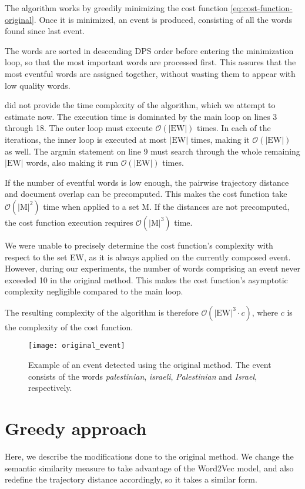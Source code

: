 The algorithm works by greedily minimizing the cost function \ref{eq:cost-function-original}. Once it is minimized, an event is produced, consisting of all the words found since last event.

The words are sorted in descending DPS order before entering the minimization loop, so that the most important words are processed first. This assures that the most eventful words are assigned together, without wasting them to appear with low quality words.

\cite{event-detection} did not provide the time complexity of the algorithm, which we attempt to estimate now. The execution time is dominated by the main loop on lines 3 through 18. The outer loop must execute $\mathcal{O}(|\text{EW}|)$ times. In each of the iterations, the inner loop is executed at most $|\text{EW}|$ times, making it $\mathcal{O}(|\text{EW}|)$ as well. The argmin statement on line 9 must search through the whole remaining $|\text{EW}|$ words, also making it run $\mathcal{O}(|\text{EW}|)$ times.

If the number of eventful words is low enough, the pairwise trajectory distance and document overlap can be precomputed. This makes the cost function take $\mathcal{O}(|\text{M}|^{2})$ time when applied to a set M. If the distances are not precomputed, the cost function execution requires $\mathcal{O}(|\text{M}|^{3})$ time.

We were unable to precisely determine the cost function's complexity with respect to the set EW, as it is always applied on the currently composed event. However, during our experiments, the number of words comprising an event never exceeded 10 in the original method. This makes the cost function's asymptotic complexity negligible compared to the main loop.

The resulting complexity of the algorithm is therefore $\mathcal{O}(|\text{EW}|^{3} \cdot c)$, where $c$ is the complexity of the cost function.


\begin{figure}[H]
  \centering
  \texttt{[image: original\_event]}  %
  \caption{Example of an event detected using the original method. The event consists of the words \textit{palestinian}, \textit{israeli}, \textit{Palestinian} and \textit{Israel}, respectively.}
  \label{fig:original-event}
\end{figure}


\section{Greedy approach}
Here, we describe the modifications done to the original method. We change the semantic similarity measure to take advantage of the Word2Vec model, and also redefine the trajectory distance accordingly, so it takes a similar form.

